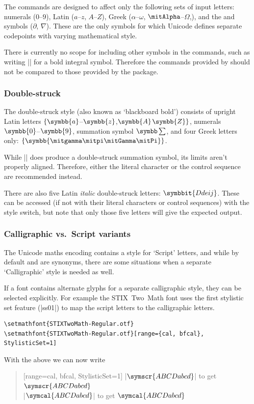The  commands are designed to affect only the following sets of input letters: numerals ($0$--$9$), Latin ($a$--$z$, $A$--$Z$), Greek ($\alpha$--$\omega$, $\Alpha$--$\Omega$,), and the  and  symbols ($\partial$, $\nabla$).
These are the only symbols for which Unicode defines separate codepoints with varying mathematical style.

There is currently no scope for including other symbols in the  commands, such as writing |\symbf{\int}| for a bold integral symbol.
Therefore the commands provided by  should not be compared to those provided by the  package.

\subsubsection{Double-struck}

The double-struck style (also known as `blackboard bold') consists of
upright Latin letters $\{\symbb{a}$--$\symbb{z}$,$\symbb{A}$$\symbb{Z}\}$,
numerals $\symbb{0}$--$\symbb{9}$, summation symbol $\symbb\sum$, and four
Greek letters only: $\{\symbb{\gamma\pi\Gamma\Pi}\}$.

While |\symbb{\sum}| does produce a double-struck summation symbol,
its limits aren't properly aligned. Therefore,
either the literal character or the control sequence  are
recommended instead.

There are also five Latin \emph{italic} double-struck letters: $\symbbit{Ddeij}$.
These can be accessed (if not with their literal characters or control sequences)
with the  style switch, but note that only those five letters
will give the expected output.

\subsubsection{Calligraphic vs.\ Script variants}

The Unicode maths encoding contains a style for `Script' letters,
and while by default  and 
are synonyms, there are some situations when a
separate `Calligraphic' style is needed as well.

If a font contains alternate glyphs for a separate calligraphic style,
they can be selected explicitly. For example the STIX~Two~Math font
uses the first stylistic set feature (|ss01|) to map the script
letters to the calligraphic letters.
\begin{Verbatim}
\setmathfont{STIXTwoMath-Regular.otf}
\setmathfont{STIXTwoMath-Regular.otf}[range={cal, bfcal}, StylisticSet=1]
\end{Verbatim}
With the above we can now write
\begin{quote}
[range={cal, bfcal}, StylisticSet=1]
|$\symscr{ABCDabcd}$| to get $\symscr{ABCDabcd}$ \\
|$\symcal{ABCDabcd}$| to get $\symcal{ABCDabcd}$
\end{quote}

